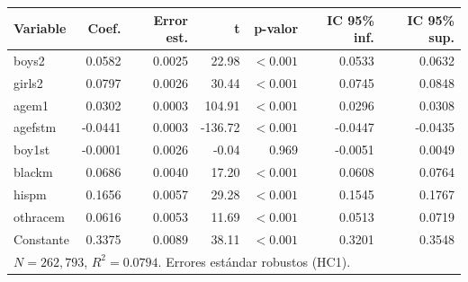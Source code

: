 
\begin{tabular}{lrrrrrr}
\toprule
Variable & Coef. & Error est. & t & p-valor & IC 95\% inf. & IC 95\% sup.\\
\midrule
boys2 & 0.0582 & 0.0025 & 22.98 & $<0.001$ & 0.0533 & 0.0632\\
girls2 & 0.0797 & 0.0026 & 30.44 & $<0.001$ & 0.0745 & 0.0848\\
agem1 & 0.0302 & 0.0003 & 104.91 & $<0.001$ & 0.0296 & 0.0308\\
agefstm & -0.0441 & 0.0003 & -136.72 & $<0.001$ & -0.0447 & -0.0435\\
boy1st & -0.0001 & 0.0026 & -0.04 & 0.969 & -0.0051 & 0.0049\\
blackm & 0.0686 & 0.0040 & 17.20 & $<0.001$ & 0.0608 & 0.0764\\
hispm & 0.1656 & 0.0057 & 29.28 & $<0.001$ & 0.1545 & 0.1767\\
othracem & 0.0616 & 0.0053 & 11.69 & $<0.001$ & 0.0513 & 0.0719\\
Constante & 0.3375 & 0.0089 & 38.11 & $<0.001$ & 0.3201 & 0.3548\\
\midrule
\multicolumn{7}{l}{$N=262{,}793$, $R^2=0.0794$. Errores estándar robustos (HC1).}\\
\bottomrule
\end{tabular}

